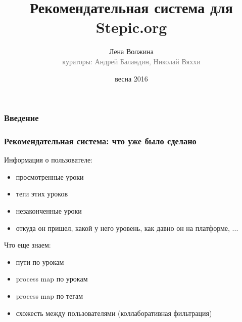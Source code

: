 \documentclass{beamer}
\begin{document}
    \title{Рекомендательная система для Stepic.org}
    \author{Лена Волжина\\{\footnotesize\textcolor{gray}{кураторы: Андрей Баландин, Николай Вяххи}}}
    \date{весна 2016}     %
\frame{\titlepage}



\begin{frame}\frametitle{Введение}  %
    \begin{figure}[H]
    \end{figure}
\end{frame}




\begin{frame}\frametitle{Рекомендательная система: что уже было сделано}
    Информация о пользователе:
    \begin{itemize}
        \item просмотренные уроки   %
        \item теги этих уроков      %
        \item незаконченные уроки  %
        \item откуда он пришел, какой у него уровень, как давно он на платформе, ...
    \end{itemize}
    \bigskip
    Что еще знаем:
    \begin{itemize}
        \item пути по урокам    %
        \item process map по урокам     %
        \item process map по тегам      %
        \item схожесть между пользователями (коллаборативная фильтрация)
    \end{itemize}
\end{frame}
\end{document}
